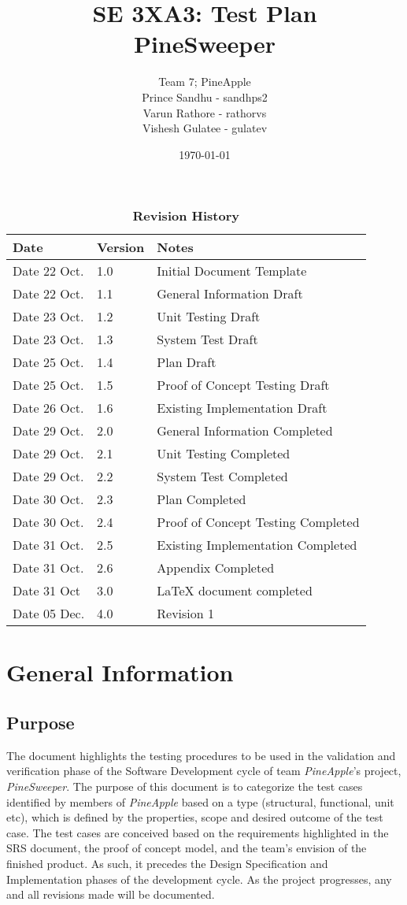 \documentclass[12pt, titlepage]{article}
\title{SE 3XA3: Test Plan\\PineSweeper}
\author{Team 7; PineApple
		\\ Prince Sandhu - sandhps2
		\\ Varun Rathore - rathorvs
		\\ Vishesh Gulatee - gulatev
}
\date{\today}
\begin{document}
\maketitle
{}
\tableofcontents
\listoftables
\listoffigures
\begin{table}[!htbp]
\caption{\bf Revision History}
\begin{tabularx}{\textwidth}{p{3cm}p{2cm}X}
\toprule {\bf Date} & {\bf Version} & {\bf Notes}\\
\midrule
Date 22 Oct. & 1.0 & Initial Document Template\\
Date 22 Oct. & 1.1 & General Information Draft\\
Date 23 Oct. & 1.2 & Unit Testing Draft\\
Date 23 Oct. & 1.3 & System Test Draft\\
Date 25 Oct. & 1.4 & Plan Draft\\
Date 25 Oct. & 1.5 & Proof of Concept Testing Draft\\
Date 26 Oct. & 1.6 & Existing Implementation Draft\\
Date 29 Oct. & 2.0 & General Information Completed\\
Date 29 Oct. & 2.1 & Unit Testing Completed\\
Date 29 Oct. & 2.2 & System Test Completed\\
Date 30 Oct. & 2.3 & Plan Completed\\
Date 30 Oct. & 2.4 & Proof of Concept Testing Completed\\
Date 31 Oct. & 2.5 & Existing Implementation Completed\\
Date 31 Oct. & 2.6 & Appendix Completed\\
Date 31 Oct & 3.0 & LaTeX document completed\\
Date 05 Dec. & 4.0 & Revision 1\\
\bottomrule
\end{tabularx}
\end{table}
\newpage
{}
\section{General Information}
\subsection{Purpose}
The document highlights the testing procedures to be used in the validation and verification phase of the Software Development cycle
of team \textit{PineApple}'s project, \textit{PineSweeper}. The purpose of this document is to categorize the test cases identified by
members of \textit{PineApple} based on a type (structural, functional, unit etc), which is defined by the properties, scope and desired
outcome of the test case. The test cases are conceived based on the requirements highlighted in the SRS document, the proof of
concept model, and the team's envision of the finished product. As such, it precedes the Design Specification and Implementation
phases of the development cycle. As the project progresses, any and all revisions made will be documented.
\end{document}

